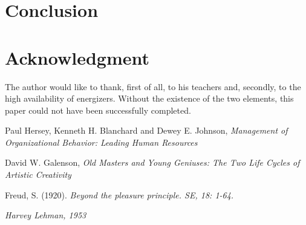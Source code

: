 \documentclass[conference]{IEEEtran}
\begin{document}
\section{Conclusion}

\section*{Acknowledgment}
The author would like to thank, first of all, to his teachers and, secondly, to the high availability of energizers. Without the existence of the two elements, this paper could not have been successfully completed. 


\newpage

\newpage
\begin{thebibliography}{99}


Paul Hersey, Kenneth H. Blanchard and Dewey E. Johnson, \emph{Management of Organizational Behavior: Leading Human Resources}

David W. Galenson, \emph{Old Masters and Young Geniuses: The Two Life Cycles of Artistic Creativity}

Freud, S. (1920). \emph{Beyond the pleasure principle. SE, 18: 1-64.}

\emph{Harvey Lehman, 1953} 

\end{thebibliography}
\end{document}
